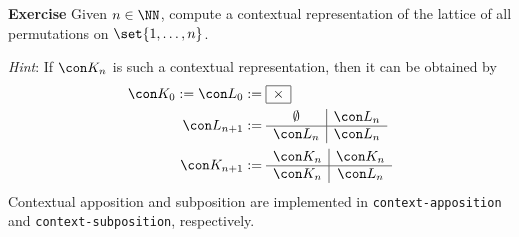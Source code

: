 \documentclass{article}
\newcounter{exercise}
\newenvironment{exercise}{\bigskip\stepcounter{exercise}\noindent\begingroup\textbf{Exercise
    \theexercise}\hspace*{.3cm}}{\endgroup}
\newcommand{\hint}{\medskip\noindent\emph{Hint}: }
\begin{document}
\begin{exercise}
  Given $n \in \NN$, compute a contextual representation of the lattice of all
  permutations on $\set{ 1, \ldots, n }$.

  \hint If $\con K_n$ is such a contextual representation, then it can be obtained by
  \begin{align*}
    \con K_0 := \con L_0 & :=
    \begin{array}{|c|}
      \hline
      \times\\
      \hline
    \end{array}
    \\
    \con L_{n+1} &:=
    \begin{array}{c|c}
      \emptyset & \con L_n \\
      \hline
      \con L_n & \con L_n
    \end{array}
    \\
    \con K_{n+1} &:=
    \begin{array}{c|c}
      \con K_n & \con K_n \\
      \hline
      \con K_n & \con L_n
    \end{array}
  \end{align*}
  Contextual apposition and subposition are implemented in \texttt{context-apposition} and
  \texttt{context-subposition}, respectively.
\end{exercise}
\end{document}
